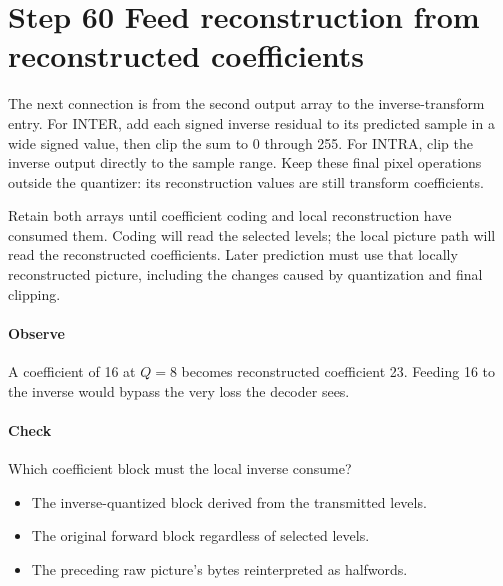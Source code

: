 \section{Step 60 Feed reconstruction from reconstructed coefficients}\label{h263-quant-s10}
The next connection is from the second output array to the inverse-transform
entry. For INTER, add each signed inverse residual to its predicted sample in a
wide signed value, then clip the sum to 0 through 255. For INTRA, clip the inverse
output directly to the sample range. Keep these final pixel operations outside
the quantizer: its reconstruction values are still transform coefficients.

Retain both arrays until coefficient coding and local reconstruction have consumed
them. Coding will read the selected levels; the local picture path will read
the reconstructed coefficients. Later prediction must use that locally reconstructed
picture, including the changes caused by quantization and final clipping.

\paragraph{Observe} A coefficient of 16 at $Q=8$ becomes reconstructed
coefficient 23. Feeding 16 to the inverse would bypass the very loss the decoder sees.
\paragraph{Check} Which coefficient block must the local inverse consume?
\begin{itemize}
  \item[A.] The inverse-quantized block derived from the transmitted levels.
  \item[B.] The original forward block regardless of selected levels.
  \item[C.] The preceding raw picture's bytes reinterpreted as halfwords.
\end{itemize}
